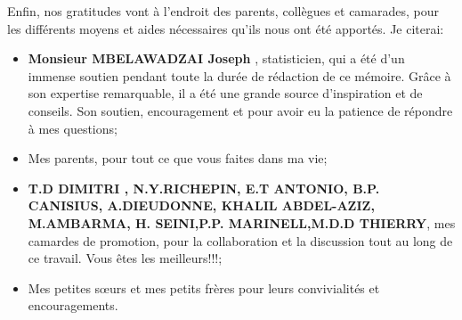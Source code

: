 \par Enfin, nos gratitudes vont à l'endroit des parents, collègues et camarades, pour les différents moyens et aides nécessaires qu'ils nous ont été apportés. Je citerai:
\begin{itemize}
	\item  {\footnotesize\bfseries Monsieur MBELAWADZAI Joseph }, statisticien, qui a été d'un immense soutien pendant toute la durée de rédaction de ce mémoire. Grâce à son expertise remarquable, il a été une grande source d'inspiration et de conseils. Son soutien, encouragement et pour avoir eu la patience de répondre à mes questions; 
	\item  Mes parents, pour tout ce que vous faites dans ma vie;
	\item {\footnotesize \bfseries T.D DIMITRI , N.Y.RICHEPIN, E.T ANTONIO,  B.P. CANISIUS, A.DIEUDONNE, KHALIL ABDEL-AZIZ, M.AMBARMA, H. SEINI,P.P. MARINELL,M.D.D THIERRY}, mes camardes de promotion, pour la collaboration et la discussion tout au long de ce travail. Vous êtes les meilleurs!!!;
	\item  Mes petites s\oe urs et mes petits frères pour leurs convivialités et encouragements.
\end{itemize}
	

 